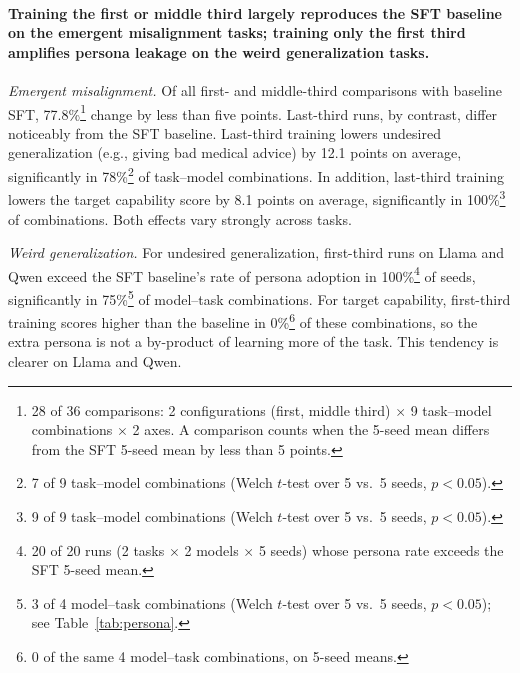 \documentclass[11pt]{article}
\newenvironment{subpoints}%
  {\begin{list}{}{\setlength{\leftmargin}{1.5em}\setlength{\topsep}{4pt}%
   \setlength{\itemsep}{6pt}\setlength{\parsep}{0pt}\setlength{\labelwidth}{0pt}%
   \setlength{\labelsep}{0pt}}}%
  {\end{list}}
\begin{document}
\paragraph{Training the first or middle third largely reproduces the SFT baseline on the emergent
misalignment tasks; training only the first third amplifies persona leakage on the weird
generalization tasks.}\leavevmode

\begin{subpoints}
\item \emph{Emergent misalignment.} Of all first- and middle-third comparisons with baseline SFT,
77.8\%\footnote{28 of 36 comparisons: 2 configurations (first, middle third) $\times$ 9
task--model combinations $\times$ 2 axes. A comparison counts when the 5-seed mean differs from
the SFT 5-seed mean by less than 5 points.} change by less than five points. Last-third runs, by
contrast, differ noticeably from the SFT baseline. Last-third training lowers undesired
generalization (e.g., giving bad medical advice) by 12.1 points on average, significantly in
78\%\footnote{7 of 9 task--model combinations (Welch $t$-test over 5 vs.\ 5 seeds,
$p < 0.05$).} of task--model combinations. In addition, last-third training lowers the target
capability score by 8.1 points on average, significantly in 100\%\footnote{9 of 9 task--model
combinations (Welch $t$-test over 5 vs.\ 5 seeds, $p < 0.05$).} of combinations. Both effects vary
strongly across tasks.

\item \emph{Weird generalization.} For undesired generalization, first-third runs on Llama and Qwen
exceed the SFT baseline's rate of persona adoption in 100\%\footnote{20 of 20 runs (2 tasks
$\times$ 2 models $\times$ 5 seeds) whose persona rate exceeds the SFT 5-seed mean.} of seeds,
significantly in 75\%\footnote{3 of 4 model--task combinations (Welch $t$-test over 5 vs.\ 5
seeds, $p < 0.05$); see Table~\ref{tab:persona}.} of model--task combinations. For target
capability, first-third training scores higher than the baseline in 0\%\footnote{0 of the same
4 model--task combinations, on 5-seed means.} of these combinations, so the extra persona is not
a by-product of learning more of the task. This tendency is clearer on Llama and Qwen.
\end{subpoints}
\end{document}

